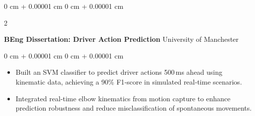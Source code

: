 \documentclass[10pt, letterpaper]{article}
\newenvironment{highlights}{
    \begin{itemize}[
        topsep=0.10 cm,
        parsep=0.10 cm,
        partopsep=0pt,
        itemsep=0pt,
        leftmargin=0 cm + 10pt
    ]
}{
    \end{itemize}
} %
\newenvironment{onecolentry}{
    \begin{adjustwidth}{
        0 cm + 0.00001 cm
    }{
        0 cm + 0.00001 cm
    }
}{
    \end{adjustwidth}
} %
\newenvironment{twocolentry}[2][]{
    \onecolentry
    \def\secondColumn{#2}
    \setcolumnwidth{\fill, 4.5 cm}
    \begin{paracol}{2}
}{
    \switchcolumn \raggedleft \secondColumn
    \end{paracol}
    \endonecolentry
} %
\begin{document}

        \vspace{0.2 cm}

        \begin{twocolentry}{
            University of Manchester
        }
            \textbf{BEng Dissertation: Driver Action Prediction}\end{twocolentry}

        \vspace{0.10 cm}
        \begin{onecolentry}
            \begin{highlights}
                \item Built an SVM classifier to predict driver actions 500 ms ahead using kinematic data, achieving a 90\% F1‑score in simulated real‑time scenarios.
                \item Integrated real‑time elbow kinematics from motion capture to enhance prediction robustness and reduce misclassification of spontaneous movements.
            \end{highlights}
        \end{onecolentry}
\end{document}
